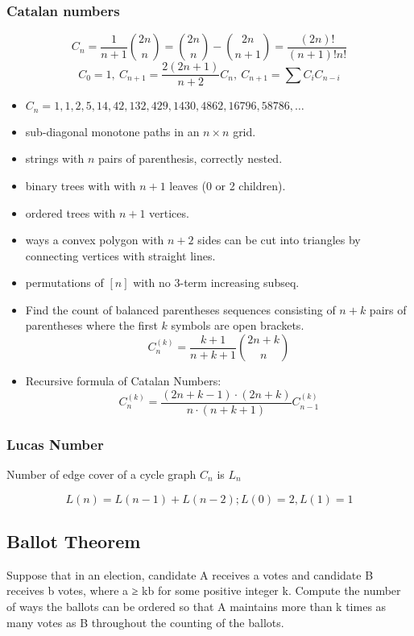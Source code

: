   \subsubsection{Catalan numbers}
    \[ C_n=\frac{1}{n+1}\binom{2n}{n}= \binom{2n}{n}-\binom{2n}{n+1} = \frac{(2n)!}{(n+1)!n!} \]
    \[ C_0=1,\ C_{n+1} = \frac{2(2n+1)}{n+2}C_n,\ C_{n+1}=\sum C_iC_{n-i} \]
    \begin{itemize}[noitemsep]
      \item ${C_n = 1, 1, 2, 5, 14, 42, 132, 429, 1430, 4862, 16796, 58786, \dots}$
      \item sub-diagonal monotone paths in an $n\times n$ grid.
      \item strings with $n$ pairs of parenthesis, correctly nested.
      \item binary trees with with $n+1$ leaves (0 or 2 children).
      \item ordered trees with $n+1$ vertices.
      \item ways a convex polygon with $n+2$ sides can be cut into triangles by connecting vertices with straight lines.
      \item permutations of $[n]$ with no 3-term increasing subseq.
      \item Find the count of balanced parentheses sequences consisting of $n + k$ pairs of parentheses where the first $k$ symbols are open brackets.
   $$C_n^{(k)} = \frac{k + 1}{n + k + 1} \binom{2n + k}{n}$$
      \item Recursive formula of Catalan Numbers:
    $$ C_{n}^{(k)} = \frac{(2n + k - 1) \cdot (2n + k)}{n \cdot (n + k + 1)} C_{n - 1}^{(k)} $$
    \end{itemize}



    \subsubsection{Lucas Number}

    Number of edge cover of a cycle graph $ C_n $ is $ L_n $

$$ L(n) = L(n-1) + L(n-2); L(0)=2, L(1)=1 $$
    
\subsection{Ballot Theorem}

Suppose that in an election, candidate A receives
a votes and candidate B receives b votes, where a ≥ kb for some positive
integer k. Compute the number of ways the ballots can be ordered so that
A maintains more than k times as many votes as B throughout the counting
of the ballots.

